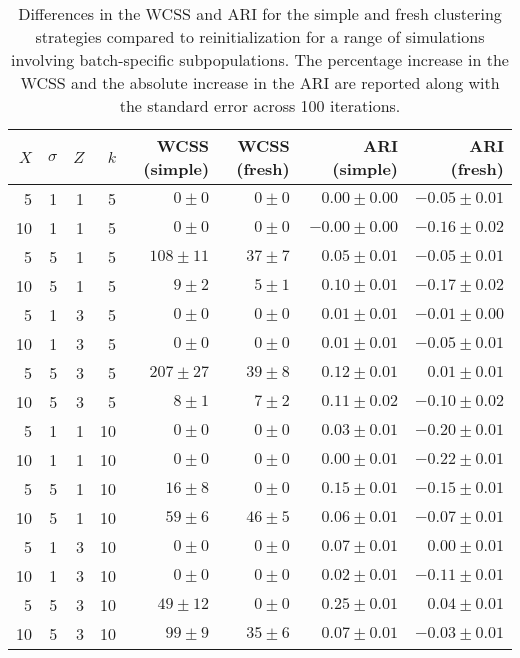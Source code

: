 \documentclass{article}
\begin{document}
\begin{table}
\caption{Differences in the WCSS and ARI for the simple and fresh clustering strategies compared to reinitialization for a range of simulations involving batch-specific subpopulations. 
The percentage increase in the WCSS and the absolute increase in the ARI are reported along with the standard error across 100 iterations.}
\label{tab:holdout-subpop}
\begin{center}
\begin{tabular}{r r r r r r r r}
\hline
$X$ & $\sigma$ & $Z$ & $k$ & WCSS (simple) & WCSS (fresh) & ARI (simple) & ARI (fresh) \\
\hline
5 & 1 & 1 & 5 & $0 \pm 0$ & $0 \pm 0$ & $0.00 \pm 0.00$ & $-0.05 \pm 0.01$ \\
10 & 1 & 1 & 5 & $0 \pm 0$ & $0 \pm 0$ & $-0.00 \pm 0.00$ & $-0.16 \pm 0.02$ \\
5 & 5 & 1 & 5 & $108 \pm 11$ & $37 \pm 7$ & $0.05 \pm 0.01$ & $-0.05 \pm 0.01$ \\
10 & 5 & 1 & 5 & $9 \pm 2$ & $5 \pm 1$ & $0.10 \pm 0.01$ & $-0.17 \pm 0.02$ \\
5 & 1 & 3 & 5 & $0 \pm 0$ & $0 \pm 0$ & $0.01 \pm 0.01$ & $-0.01 \pm 0.00$ \\
10 & 1 & 3 & 5 & $0 \pm 0$ & $0 \pm 0$ & $0.01 \pm 0.01$ & $-0.05 \pm 0.01$ \\
5 & 5 & 3 & 5 & $207 \pm 27$ & $39 \pm 8$ & $0.12 \pm 0.01$ & $0.01 \pm 0.01$ \\
10 & 5 & 3 & 5 & $8 \pm 1$ & $7 \pm 2$ & $0.11 \pm 0.02$ & $-0.10 \pm 0.02$ \\
5 & 1 & 1 & 10 & $0 \pm 0$ & $0 \pm 0$ & $0.03 \pm 0.01$ & $-0.20 \pm 0.01$ \\
10 & 1 & 1 & 10 & $0 \pm 0$ & $0 \pm 0$ & $0.00 \pm 0.01$ & $-0.22 \pm 0.01$ \\
5 & 5 & 1 & 10 & $16 \pm 8$ & $0 \pm 0$ & $0.15 \pm 0.01$ & $-0.15 \pm 0.01$ \\
10 & 5 & 1 & 10 & $59 \pm 6$ & $46 \pm 5$ & $0.06 \pm 0.01$ & $-0.07 \pm 0.01$ \\
5 & 1 & 3 & 10 & $0 \pm 0$ & $0 \pm 0$ & $0.07 \pm 0.01$ & $0.00 \pm 0.01$ \\
10 & 1 & 3 & 10 & $0 \pm 0$ & $0 \pm 0$ & $0.02 \pm 0.01$ & $-0.11 \pm 0.01$ \\
5 & 5 & 3 & 10 & $49 \pm 12$ & $0 \pm 0$ & $0.25 \pm 0.01$ & $0.04 \pm 0.01$ \\
10 & 5 & 3 & 10 & $99 \pm 9$ & $35 \pm 6$ & $0.07 \pm 0.01$ & $-0.03 \pm 0.01$ \\
\hline
\end{tabular}
\end{center}
\end{table}
\end{document}
